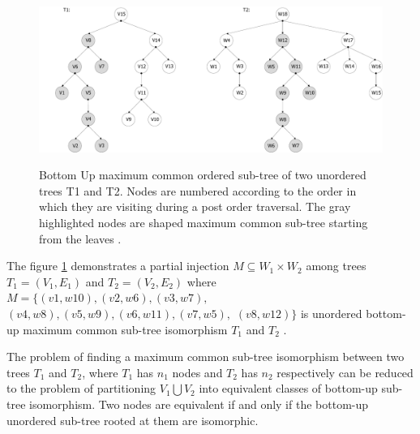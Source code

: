 \documentclass{report}
\begin{document}
\begin{figure}[th]
  \centering
  \includegraphics[scale=0.45]{Figures/algorithms/BU/bottom-up-max-common-example.pdf}\\[0.1cm]
  \caption[Bottom Up maximum common ordered sub-tree of two unordered trees]{Bottom Up maximum common ordered sub-tree of two unordered trees T1 and T2. Nodes are numbered according to the order in which they are visiting during a post order traversal. The gray highlighted nodes are shaped maximum common sub-tree starting from the leaves \cite{valiente}.}
  \label{fig:bottom-up-max-common-example}
\end{figure}

The figure \ref{fig:bottom-up-max-common-example} demonstrates a partial injection $M \subseteq W_{1} \times  W_{2}$ among trees $ T_{1} = ( V_{1}, E_{1})$ and  $ T_{2} = ( V_{2}, E_{2})$ where $M  = \{ (v1,w10),  (v2,w6), (v3,w7), $ \\
$(v4,w8),  (v5,w9),  (v6,w11),  (v7,w5), $  $ (v8,w12)\}$ is unordered bottom-up maximum common sub-tree isomorphism $ T_{1}$ and $ T_{2 }$ \cite{valiente}.

The problem of finding a maximum common sub-tree isomorphism between two trees $ T_{1}$ and $ T_{2 }$, where $ T_{1}$ has $n_{1}$ nodes and $ T_{2}$ has $n_{2}$ respectively can be reduced to the problem of partitioning $ V_{1}\bigcup V_{2}$ into equivalent classes of bottom-up sub-tree isomorphism. Two nodes are equivalent if and only if the bottom-up unordered sub-tree rooted at them are isomorphic.
\end{document}
